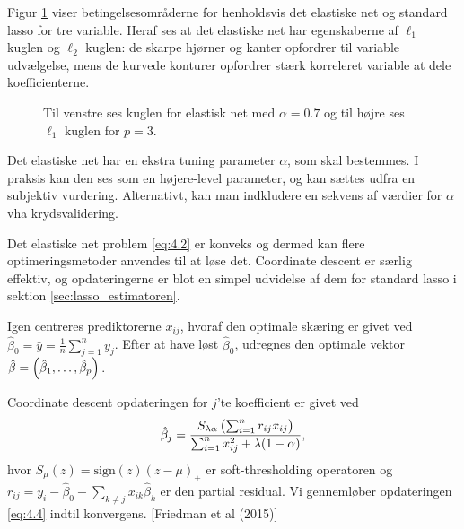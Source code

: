 Figur \ref{fig:elastisk_net} viser betingelsesområderne for henholdsvis det elastiske net og standard lasso for tre variable.
Heraf ses at det elastiske net har egenskaberne af $\ell_1$ kuglen og $\ell_2$ kuglen: de skarpe hjørner og kanter opfordrer til variable udvælgelse, mens de kurvede konturer opfordrer stærk korreleret variable at dele koefficienterne.
%
\begin{figure}[H]
\centering
\caption{Til venstre ses kuglen for elastisk net med \(\alpha=0.7\) og til højre ses \(\ell_1\) kuglen for \(p=3\).}
\label{fig:elastisk_net}
\end{figure}
%
Det elastiske net har en ekstra tuning parameter $\alpha$, som skal bestemmes.
I praksis kan den ses som en højere-level parameter, og kan sættes udfra en subjektiv vurdering. 
Alternativt, kan man indkludere en sekvens af værdier for $\alpha$ vha krydsvalidering.

Det elastiske net problem \eqref{eq:4.2} er konveks og dermed kan flere optimeringsmetoder anvendes til at løse det.
Coordinate descent er særlig effektiv, og opdateringerne er blot en simpel udvidelse af dem for standard lasso i sektion \ref{sec:lasso_estimatoren}.

Igen centreres prediktorerne \(x_{ij}\), hvoraf den optimale skæring er givet ved \(\hat{\beta}_0=\bar{y}=\frac{1}{n} \sum_{j=1}^n y_j\).
Efter at have løst \(\hat{\beta}_0\), udregnes den optimale vektor \(\hat{\beta}= \del{\hat{\beta}_1, \ldots, \hat{\beta}_p}\).

Coordinate descent opdateringen for $j$'te koefficient er givet ved
\begin{align}
\hat{\beta}_j = \frac{S_{\lambda \alpha} \del{\sum_{i=1}^n r_{ij} x_{ij}}}{\sum_{i=1}^n x_{ij}^2 + \lambda (1-\alpha)}, \label{eq:4.4}
\end{align} 
hvor $S_\mu(z)=\text{sign}(z)(z-\mu)_+$ er soft-thresholding operatoren og $r_{ij}=y_i - \hat{\beta}_0 - \sum_{k \neq j} x_{ik} \hat{\beta}_k$ er den partial residual.
Vi gennemløber opdateringen \eqref{eq:4.4} indtil konvergens.
[Friedman et al (2015)]


